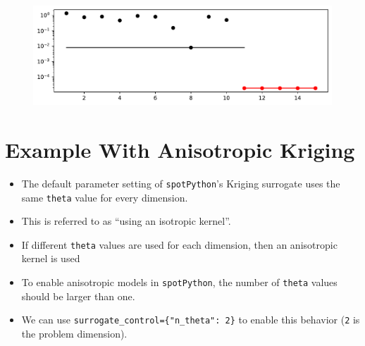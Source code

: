\documentclass[
  letterpaper,
  DIV=11,
  numbers=noendperiod]{scrreprt}
\providecommand{\tightlist}{%
  \setlength{\itemsep}{0pt}\setlength{\parskip}{0pt}}\usepackage{longtable,booktabs,array}
\begin{document}
\begin{figure}[H]

{\centering \includegraphics{009_num_spot_anisotropic_files/figure-pdf/cell-6-output-1.pdf}

}

\end{figure}

\hypertarget{example-with-anisotropic-kriging}{%
\section{Example With Anisotropic
Kriging}\label{example-with-anisotropic-kriging}}

\begin{itemize}
\tightlist
\item
  The default parameter setting of \texttt{spotPython}'s Kriging
  surrogate uses the same \texttt{theta} value for every dimension.
\item
  This is referred to as ``using an isotropic kernel''.
\item
  If different \texttt{theta} values are used for each dimension, then
  an anisotropic kernel is used
\item
  To enable anisotropic models in \texttt{spotPython}, the number of
  \texttt{theta} values should be larger than one.
\item
  We can use \texttt{surrogate\_control=\{"n\_theta":\ 2\}} to enable
  this behavior (\texttt{2} is the problem dimension).
\end{itemize}
\end{document}
